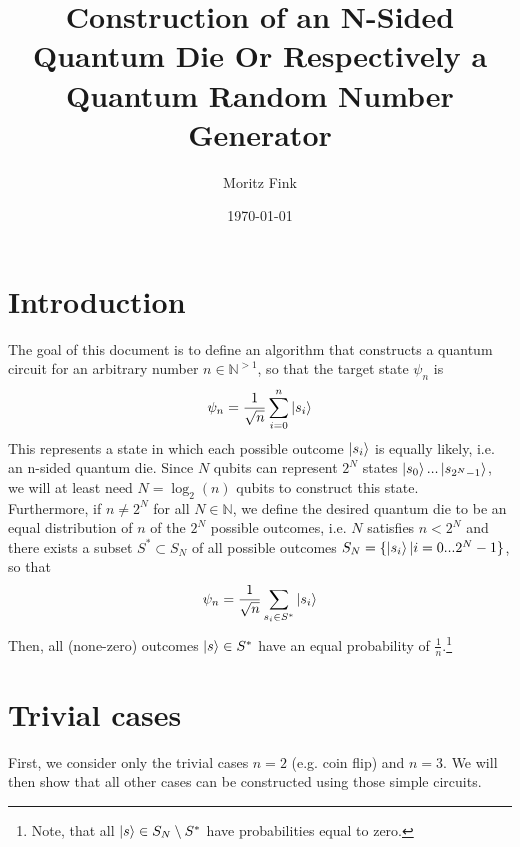 \documentclass[12pt]{amsart}
\title[Construction of an N-Sided Quantum Die]{Construction of an N-Sided Quantum Die Or Respectively a Quantum Random Number Generator}
\author{Moritz Fink}
\date{\today} %
\begin{document}
\pagecolor{white}

\lstset{language=Python}

\maketitle
\tableofcontents

\section{Introduction}
The goal of this document is to define an algorithm that constructs a quantum circuit for an arbitrary number $n\in\mathbb{N}^{>1}$, so that the target state $\psi_{n}$ is
\begin{equation}
\psi_{n} = \frac{1}{\sqrt{n}} \sum_{i=0}^{n} \ket{s_{i}}
\end{equation}
This represents a state in which each possible outcome $\ket{s_{i}}$ is equally likely, i.e. an n-sided quantum die. Since $N$ qubits can represent $2^{N}$ states $\ket{s_{0}}...\ket{s_{2^{N}-1}}$, we will at least need $N=\log_{2}(n)$ qubits to construct this state.\\
Furthermore, if $n \neq 2^{N}$ for all $N\in\mathbb{N}$, we define the desired quantum die to be an equal distribution of $n$ of the $2^{N}$ possible outcomes, i.e. $N$ satisfies $n<2^{N}$ and there exists a subset $S^{*} \subset S_{N}$ of all possible outcomes $S_{N} = \{\ket{s_{i}} | i=0...2^{N}-1\}$, so that 
\begin{equation}
\psi_{n} = \frac{1}{\sqrt{n}} \sum_{s_{i}\in S^{*}} \ket{s_{i}}
\end{equation}
Then, all (none-zero) outcomes $\ket{s} \in S^{*}$ have an equal probability of $\frac{1}{n}$.\footnote{Note, that all $\ket{s}\in S_{N}\setminus S^{*}$ have probabilities equal to zero.}

\section{Trivial cases}
First, we consider only the trivial cases $n=2$ (e.g. coin flip) and $n=3$. We will then show that all other cases can be constructed using those simple circuits.
\end{document}
